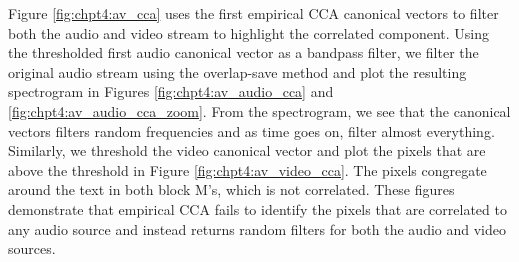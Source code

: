 Figure \ref{fig:chpt4:av_cca} uses the first empirical CCA canonical vectors to filter
both the audio and video stream to highlight the correlated component. Using the
thresholded first audio canonical vector as a bandpass filter, we filter the original
audio stream using the overlap-save method and plot the resulting spectrogram in Figures
\ref{fig:chpt4:av_audio_cca} and \ref{fig:chpt4:av_audio_cca_zoom}. From the spectrogram,
we see that the canonical vectors filters random frequencies and as time goes on, filter
almost everything. Similarly, we threshold the video canonical vector and plot the pixels
that are above the threshold in Figure \ref{fig:chpt4:av_video_cca}. The pixels congregate
around the text in both block M's, which is not correlated. These figures demonstrate that
empirical CCA fails to identify the pixels that are correlated to any audio source and
instead returns random filters for both the audio and video sources.

